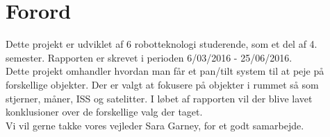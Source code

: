 \section*{Forord}

Dette projekt er udviklet af 6 robotteknologi studerende, som et del af 4. semester. Rapporten er skrevet i perioden 6/03/2016 - 25/06/2016. 
\\
Dette projekt omhandler hvordan man får et pan/tilt system til at peje på forskellige objekter. Der er valgt at fokusere på objekter i rummet så som stjerner, måner, ISS og satelitter. I løbet af rapporten vil der blive lavet konklusioner over de forskellige valg der taget.
\\
Vi vil gerne takke vores vejleder Sara Garney, for et godt samarbejde.
